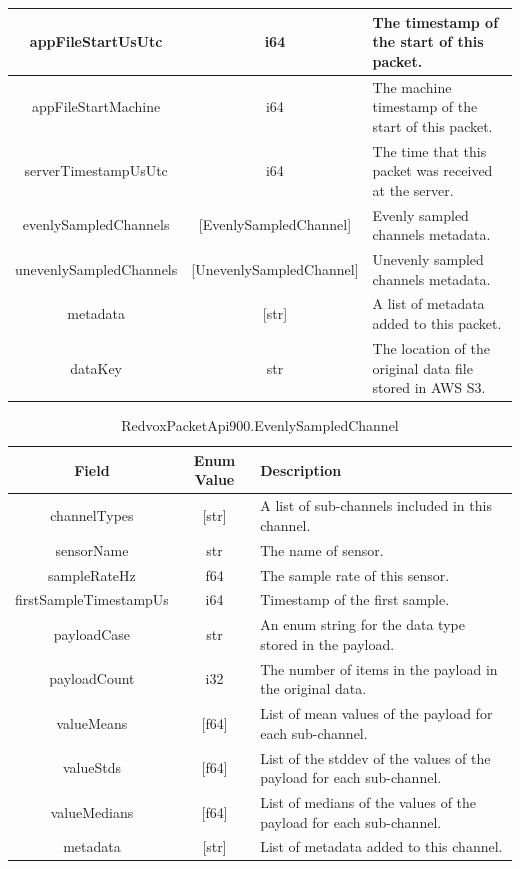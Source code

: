 \begin{table}[H]
\begin{tabular}{|c|c| p{7.5cm} |}
		\hline
		appFileStartUsUtc & i64 & The timestamp of the start of this packet. \\
		\hline
		appFileStartMachine & i64 & The machine timestamp of the start of this packet. \\
		\hline
		serverTimestampUsUtc & i64 & The time that this packet was received at the server. \\
		\hline
		evenlySampledChannels & [EvenlySampledChannel] & Evenly sampled channels metadata. \\
		\hline
		unevenlySampledChannels& [UnevenlySampledChannel] & Unevenly sampled channels metadata. \\
		\hline
		metadata & [str] & A list of metadata added to this packet. \\
		\hline
		dataKey & str & The location of the original data file stored in AWS S3. \\
		\hline
	\end{tabular}
	\label{table:RedvoxPacketApi900}
\end{table}

\begin{table}[H]
	\centering
	\caption{RedvoxPacketApi900.EvenlySampledChannel}
	\begin{tabular}{|c|c| p{8cm} |}
		\hline
		Field & Enum Value & Description  \\
		\hline
		channelTypes & [str] & A list of sub-channels included in this channel. \\
		\hline
		sensorName & str & The name of sensor. \\
		\hline
		sampleRateHz & f64 & The sample rate of this sensor. \\
		\hline
		firstSampleTimestampUs & i64 & Timestamp of the first sample. \\
		\hline
		payloadCase & str & An enum string for the data type stored in the payload. \\
		\hline
		payloadCount & i32 & The number of items in the payload in the original data. \\
		\hline
		valueMeans & [f64] & List of mean values of the payload for each sub-channel. \\
		\hline
		valueStds & [f64] & List of the stddev of the values of the payload for each sub-channel. \\
		\hline
		valueMedians & [f64] & List of medians of the values of the payload for each sub-channel. \\
		\hline
		metadata & [str] & List of metadata added to this channel. \\
		\hline
	\end{tabular}
	\label{table:EvenlySampledChannel}
\end{table}

